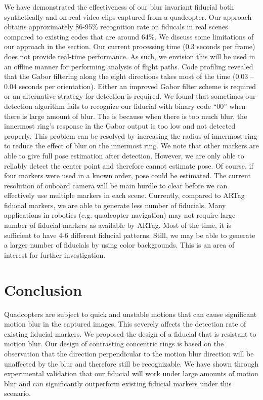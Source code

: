 \documentclass[10pt,twocolumn,letterpaper]{article}
\begin{document}
We have demonstrated the effectiveness of our blur invariant fiducial both
synthetically and on real video clips captured from a quadcopter.   Our approach obtains
approximately 86-95\% recognition rate on fiducals in real scenes compared to existing codes
that are around 64\%.  We discuss some limitations of our approach in the
section.
Our  current processing time (0.3 seconds per frame) does not provide
real-time performance.  As such, we envision this will be used in an
offline manner for performing analysis of flight paths. Code profiling revealed
that the Gabor filtering along the eight directions takes most of the time
(0.03 -- 0.04 seconds per orientation).  Either an improved Gabor filter scheme
is required or an alternative strategy for detection is required.
We found that sometimes our detection
algorithm fails to recognize our fiducial with binary code ``00'' when there is
large amount of blur.  The is because when there is too much blur, the innermost
ring's response in the Gabor output is too low and not detected properly.
This problem can be resolved by increasing the radius of innermost ring to
reduce the effect of blur on the innermost ring.
We note that other markers are able to give
full pose estimation after detection.  However, we are only able to reliably detect
the center point and therefore cannot estimate pose.  Of course, if four
markers were used in a known order, pose could be estimated. The current
resolution of onboard camera will be main hurdle to clear before we can
effectively use multiple markers in each scene.
Currently, compared to ARTag fiducial markers, we are able to generate less
number of fiducials. Many applications in robotics (e.g. quadcopter navigation)
may not require large number of fiducial markers as available by ARTag.  Most
of the time, it is sufficient to have 4-6 different fiducial patterns. Still,
we may be able to generate a larger number of fiducials by using color
backgrounds. This is an area of interest for further investigation.

\section{Conclusion}

Quadcopters are subject to quick and unstable motions that can cause significant
motion blur in the captured images. This severely affects the detection rate of
existing fiducial markers. We proposed the design of a fiducial that is
resistant to motion blur. Our design of contrasting concentric rings is based on the
observation that the direction perpendicular to the motion blur direction will
be unaffected by the blur and therefore still be recognizable. We have shown
through experimental validation that our fiducial will work under large
amounts of motion blur and can significantly outperform existing fiducial
markers under this scenario.

{\small


}
\end{document}
